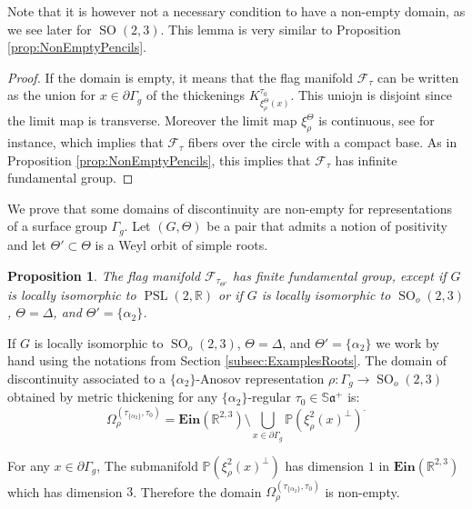 \documentclass[reqno,10pt]{amsart}
\theoremstyle{plain}
\newtheorem{prop}[thm]{Proposition}
\theoremstyle{definition}
\theoremstyle{remark}
\newcommand{\type}{\tau}
\newcommand{\typeS}{{\tau_0}}
\newcommand{\R}{\mathbb{R}}
\newcommand{\Sph}{\mathbb{S}}
\DeclareMathOperator{\PSL}{PSL}
\DeclareMathOperator{\SO}{SO}
\newcommand{\Ein}{\mathbf{Ein}}
\begin{document}
 Note that it is however not a necessary condition to have a non-empty domain, as we see later for $\SO(2,3)$. This lemma is very similar to Proposition \ref{prop:NonEmptyPencils}.
 
\medskip 
 
\begin{proof}
 
If the domain is empty, it means that the flag manifold $\mathcal{F}_\type$ can be written as the union for $x\in \partial \Gamma_g$ of the thickenings $K^{\type_0}_{\xi_\rho^\Theta(x)}$. This uniojn is disjoint since the limit map is transverse. Moreover the limit map $\xi^\Theta_\rho$ is continuous, see \cite{BPS} for instance, which implies that $\mathcal{F}_\type$ fibers over the circle with a compact base. As in Proposition \ref{prop:NonEmptyPencils}, this implies that $\mathcal{F}_\type$ has infinite fundamental group.
\end{proof}

We prove that some domains of discontinuity are non-empty for representations of a surface group $\Gamma_g$. Let $(G, \Theta)$ be a pair that admits a notion of positivity and let $\Theta'\subset \Theta$ is a Weyl orbit of simple roots.

\begin{prop}
\label{prop:CheckNonEmptyPositivity}
The flag manifold $\mathcal{F}_{\type_{\Theta'}}$ has finite fundamental group, except if $G$ is locally isomorphic to $\PSL(2, \R)$ or if $G$ is locally isomorphic to $\SO_o(2,3)$, $\Theta=\Delta$, and $\Theta'=\lbrace\alpha_2\rbrace$.
\end{prop}

If $G$ is locally isomorphic to $\SO_o(2,3)$, $\Theta=\Delta$, and $\Theta'=\lbrace\alpha_2\rbrace$ we work by hand using the notations from Section \ref{subsec:ExamplesRoots}. The domain of discontinuity associated to a $\lbrace \alpha_2\rbrace$-Anosov representation $\rho:\Gamma_g\to \SO_o(2,3)$ obtained by metric thickening for any $\lbrace \alpha_2\rbrace$-regular $\typeS\in \Sph\mathfrak{a}^+$ is:
$$\Omega_\rho^{(\type_{\lbrace \alpha_2\rbrace},\typeS)}=\Ein(\R^{2,3})\setminus \bigcup_{x\in \partial\Gamma_g}\mathbb{P}\left(\xi^2_\rho(x)^\perp\right)^ .$$

For any $x\in \partial\Gamma_g$, The submanifold $\mathbb{P}\left(\xi^2_\rho(x)^\perp\right)$ has dimension $1$ in $\Ein(\R^{2,3})$ which has dimension $3$. Therefore the domain $\Omega_\rho^{(\type_{\lbrace \alpha_2\rbrace},\typeS)}$ is non-empty.

\medskip
\end{document}
